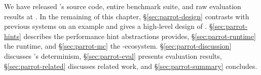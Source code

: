 We have released \parrot's source code, entire benchmark suite, and
raw evaluation results at \github. In the remaining of this chapter,
\S\ref{sec:parrot-design} contrasts \parrot with 
previous systems on an example and gives a high-level design of
\parrot. \S\ref{sec:parrot-hints} describes the performance hint abstractions
\parrot provides, \S\ref{sec:parrot-runtime} the \parrot runtime,
and \S\ref{sec:parrot-mc} the
\parrot-\dbug ecosystem. \S\ref{sec:parrot-discussion} discusses \parrot's
determinism, \S\ref{sec:parrot-eval}
presents evaluation results, \S\ref{sec:parrot-related}
discusses related work, and \S\ref{sec:parrot-summary} concludes.
